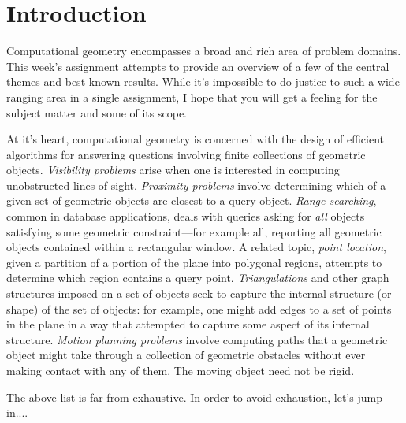 \documentclass[11pt]{article}
\begin{document}
\section{Introduction}
Computational geometry encompasses a broad and rich area of problem domains.  This week's assignment attempts to provide an overview of a few of the central themes and best-known results. While it's impossible to do justice to such a wide ranging area in a single assignment, I hope that you will get a feeling for the subject matter and some of its scope.

At it's heart, computational geometry is concerned with the design of efficient algorithms for answering questions involving
finite collections of geometric objects.  {\em Visibility problems} arise when one is interested in computing unobstructed lines of sight. {\em Proximity problems} involve determining which of a given set of geometric objects are closest to a
query object. {\em Range searching}, common in database applications, deals with queries asking for
{\em all} objects satisfying some geometric constraint---for example all, reporting all geometric objects contained within
a rectangular window.  A related topic, {\em point location}, given a partition of a portion of the plane into polygonal
regions, attempts to determine which region contains a query point.
{\em Triangulations} and other graph structures imposed on a set of objects seek to capture  the internal structure (or shape) of the set of objects: for example,
one might add edges to a set of points in the plane in a way that attempted to capture some aspect of its internal structure.
{\em Motion planning problems} involve computing paths that a geometric object might take through a collection of
geometric obstacles without ever making contact with any of them.  The moving object need not be rigid.

The above list is far from exhaustive.  In order to avoid exhaustion, let's jump in....
\end{document}
